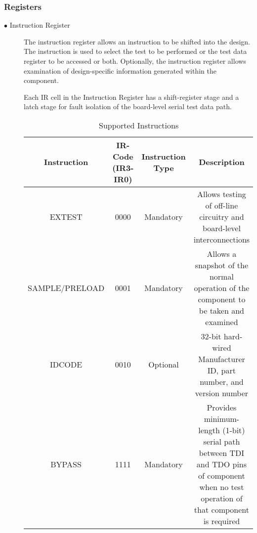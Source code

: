 \documentclass[a4paper,11pt]{article}
\begin{document}
\subsubsection{Registers}
\begin{description}
\item [$\bullet$ Instruction Register]
The instruction register allows an instruction to be shifted into the design. The instruction is used to select the test to be performed or the test data register to be accessed or both. Optionally, the instruction register allows examination of design-specific information generated within the component.

Each IR cell in the Instruction Register has a shift-register stage and a latch stage for fault isolation of the board-level serial test data path.\cite{microsemi}\cite{Osseiran}


\begin{center}
\begin{table}[!h]
\caption{Supported Instructions\cite{microsemi}}
\label{table:IR}
\begin{tabular}{|c|c|c|c|}
 \hline
 \textbf{Instruction} & \multicolumn{1}{m{2cm}|}{\textbf{IR-Code (IR3-IR0)}} & \multicolumn{1}{m{2cm}|}{\textbf{Instruction Type}} & \textbf{Description} \\ \hline
 
 EXTEST & 0000 & Mandatory & \multicolumn{1}{m{7cm}|}{Allows testing of off-line circuitry and board-level interconnections}\\\hline
 
 SAMPLE/PRELOAD & 0001 & Mandatory & \multicolumn{1}{m{7cm}|}{Allows a snapshot of the normal operation of the component to be taken and examined}\\\hline

 IDCODE & 0010 & Optional & \multicolumn{1}{m{7cm}|}{32-bit hard-wired Manufacturer ID, part number, and version number}\\\hline

BYPASS & 1111 & Mandatory & \multicolumn{1}{m{7cm}|}{Provides minimum-length (1-bit) serial path between TDI and TDO pins of component when no test operation of that component is required}\\\hline


\end{tabular}
\end{table}
\end{center}
\end{description}
\end{document}
